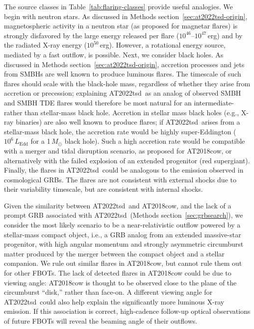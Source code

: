 \documentclass{nature_plusfigure}
\newcommand{\at}{AT2022tsd}
\begin{document}
The source classes in Table~\ref{tab:flaring-classes} provide useful analogies. We begin with neutron stars. As discussed in Methods section~\ref{sec:at2022tsd-origin}, magnetospheric activity in a neutron star (as proposed for magnetar flares) is strongly disfavored by the large energy released per flare ($10^{46}$--$10^{47}$\,erg) and by the radiated X-ray energy ($10^{50}$\,erg).
However, a rotational energy source, mediated by a fast outflow, is possible.
Next, we consider black holes. As discussed in Methods section~\ref{sec:at2022tsd-origin}, accretion processes and jets from SMBHs are well known to produce luminous flares. The timescale of such flares should scale with the black-hole mass, regardless of whether they arise from accretion or precession; explaining \at\ as an analog of observed SMBH and SMBH TDE flares would therefore be most natural for an intermediate- rather than stellar-mass black hole.
Accretion in stellar mass black holes (e.g., X-ray binaries) are also well known to produce flares; if \at\ arises from a stellar-mass black hole, the accretion rate would be highly super-Eddington ($10^{6}\,L_\mathrm{Edd}$ for a 1\,$M_\odot$ black hole). Such a high accretion rate would be compatible with a merger and tidal disruption scenario, as proposed for AT2018cow\cite{Metzger2022}, or alternatively with the failed explosion of an extended progenitor\cite{Quataert2012} (red supergiant).
Finally, the flares in \at\ could be analogous to the emission observed in cosmological GRBs. The flares are not consistent with external shocks due to their variability timescale, but are consistent with internal shocks.

Given the similarity between \at\ and AT2018cow, and the lack of a prompt GRB associated with \at\ (Methods section~\ref{sec:grbsearch}), we consider the most likely scenario to be a near-relativistic outflow powered by a stellar-mass compact object, i.e., a GRB analog from an extended massive-star progenitor\cite{Quataert2012}, with high angular momentum and strongly asymmetric circumburst matter produced by the merger between the compact object and a stellar companion\cite{Metzger2022}.
We rule out similar flares in AT2018cow, but cannot rule them out for other FBOTs.
The lack of detected flares in AT2018cow could be due to viewing angle: AT2018cow is thought to be observed close to the plane of the circumburst ``disk,'' rather than face-on\cite{Margutti2019,Chen2023}. A different viewing angle for \at\ could also help explain the significantly more luminous X-ray emission.
If this association is correct, high-cadence follow-up optical observations of future FBOTs will reveal the beaming angle of their outflows.
\end{document}
